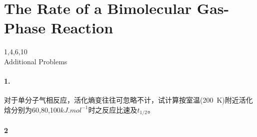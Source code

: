 \documentclass[a4paper]{article}
\newcommand{\ex}[1]{\paragraph{#1}}
\numberwithin{equation}{section}
\begin{document}
\setcounter{section}{27}
\section{The Rate of a Bimolecular Gas-Phase Reaction}
1,4,6,10\\

Additional Problems\\
\ex{1.} 对于单分子气相反应，活化熵变往往可忽略不计，试计算按室温(\SI{200}{K})附近活化焓分别为60,80,100$ \si{kJ.mol^{-1}} $时之反应比速及$ t_{1/2} $。


\ex{2}
\end{document}
